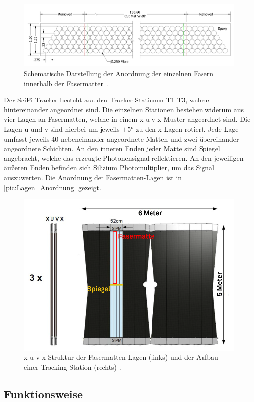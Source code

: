 \begin{figure}
    \centering
    \includegraphics[width = .8\textwidth]{content/pics/Anordnung.png}
    \caption{Schematische Darstellung der Anordnung der einzelnen Fasern innerhalb der Fasermatten \cite{SciFi_Versuch}.}
    \label{pic:Anordnung_Matte}
\end{figure}
Der SciFi Tracker besteht aus den Tracker Stationen T1-T3, welche hintereinander angeordnet sind. Die einzelnen 
Stationen bestehen widerum aus vier Lagen an Fasermatten, welche in einem x-u-v-x Muster angeordnet sind. Die Lagen u und v
sind hierbei um jeweils $\pm 5°$ zu den x-Lagen rotiert. Jede Lage umfasst jeweils 40 nebeneinander angeordnete Matten und zwei übereinander
angeordnete Schichten. An den inneren Enden jeder Matte sind Spiegel angebracht, welche das erzeugte Photonensignal 
reflektieren. An den jeweiligen äußeren Enden befinden sich Silizium Photomultiplier, um das Signal auszuwerten. Die Anordnung
der Fasermatten-Lagen ist in \autoref{pic:Lagen_Anordnung} gezeigt.
\begin{figure}
    \centering
    \includegraphics[width = .8\textwidth]{content/pics/Lagen_Anordnung.png}
    \caption{x-u-v-x Struktur der Fasermatten-Lagen (links) und der Aufbau einer Tracking Station (rechts) \cite{SciFi_Versuch}.}
    \label{pic:Lagen_Anordnung}
\end{figure}

\subsection{Funktionsweise}

